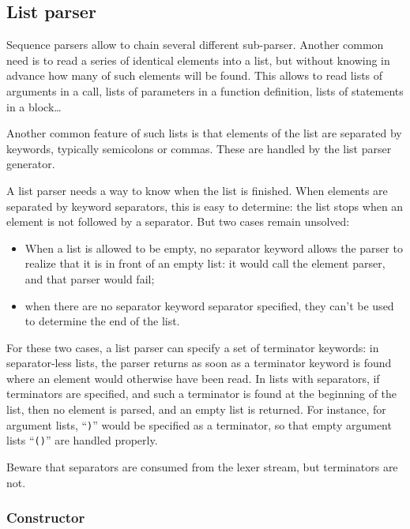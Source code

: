 \subsection{List parser}

Sequence parsers allow to chain several different sub-parser. Another
common need is to read a series of identical elements into a list, but
without knowing in advance how many of such elements will be
found. This allows to read lists of arguments in a call, lists of
parameters in a function definition, lists of statements in a
block\ldots

Another common feature of such lists is that elements of the list are
separated by keywords, typically semicolons or commas. These are
handled by the list parser generator.

A list parser needs a way to know when the list is finished. When
elements are separated by keyword separators, this is easy to
determine: the list stops when an element is not followed by a
separator. But two cases remain unsolved:
\begin{itemize}
\item When a list is allowed to be empty, no separator keyword allows
  the parser to realize that it is in front of an empty list: it would
  call the element parser, and that parser would fail;
\item when there are no separator keyword separator specified, they
  can't be used to determine the end of the list.
\end{itemize}

For these two cases, a list parser can specify a set of terminator
keywords: in separator-less lists, the parser returns as soon as a 
terminator keyword is found where an element would otherwise have been
read. In lists with separators, if terminators are specified, and such
a terminator is found at the beginning of the list, then no element is
parsed, and an empty list is returned. For instance, for argument
lists, ``\verb|)|'' would be specified as a terminator, so that empty
argument lists ``\verb|()|'' are handled properly.

Beware that separators are consumed from the lexer stream, but
terminators are not.


\subsubsection{Constructor}

